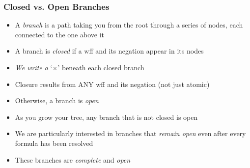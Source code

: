 \begin{frame}
\frametitle{Closed vs. Open Branches}

\begin{itemize}[<+->]

\item A \emph{branch} is a path taking you from the root through a series of nodes, each connected to the one above it

\bigskip

\item A branch is \emph{closed} if a wff and its negation appear in its nodes

\bi
\item \emph{We write a} `\emph{$\times$}' beneath each closed branch

\item Closure results from ANY wff and its negation (not just atomic) 
\ei


\bigskip

\item Otherwise, a branch is \emph{open}

\bi

\item As you grow your tree, any branch that is not closed is open

\item We are particularly interested in branches that \textit{remain open} even after every formula has been resolved

\item These branches are \emph{complete} and \emph{open} 

\ei 




\end{itemize}
\end{frame}

